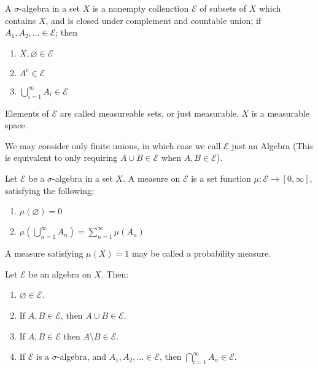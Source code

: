 \documentclass{article}
\begin{document}
\begin{defn}
    A $\sigma$-algebra in a set $X$ is a nonempty collenction $\mathcal{E}$ of subsets of $X$ which contains $X$, and is closed under complement and countable union; if $A_1,A_2,\dots \in \mathcal{E}$; then
    \begin{enumerate}
        \item $X,\varnothing\in \mathcal{E}$
        \item $A^{c}\in \mathcal{E}$
        \item $\bigcup_{i=1}^\infty A_i\in \mathcal{E}$
    \end{enumerate}
    Elements of $\mathcal{E}$ are called measureable sets, or just measurable. $X$ is a measurable space.

    We may consider only finite unions, in which case we call $\mathcal{E}$ just an Algebra (This is equivalent to only requiring $A\cup B\in \mathcal{E}$ when $A,B\in \mathcal{E}$).
\end{defn}

\begin{defn}[Measure]
    Let $\mathcal{E} $ be a  $\sigma $-algebra in a set $X$. A measure on $\mathcal{E}$ is a set function $\mu:\mathcal{E}\to [0,\infty]$, satisfying the following:
    \begin{enumerate}
        \item $\mu(\varnothing)=0$
        \item $\mu\left( \bigcup_{n=1} ^{\infty}A_n \right) =\sum_{n=1}^{\infty} \mu(A_n)$
    \end{enumerate}
    A measure satisfying $\mu(X)=1$ may be called a probability measure.
\end{defn}

\begin{prop}
    Let $\mathcal{E}$ be an algebra on $X$. Then:
    \begin{enumerate}
        \item $\varnothing\in \mathcal{E}$.
        \item If $A,B\in \mathcal{E}$, then $A\cup B\in \mathcal{E}$.
        \item If $A,B\in \mathcal{E}$ then $A \setminus B\in \mathcal{E}$.
        \item If $\mathcal{E}$ is a $\sigma$-algebra, and $A_1,A_2,\dots \in \mathcal{E}$, then $\bigcap_{i=1} ^{\infty}A_n\in \mathcal{E}$.
    \end{enumerate}
\end{prop}
\end{document}
